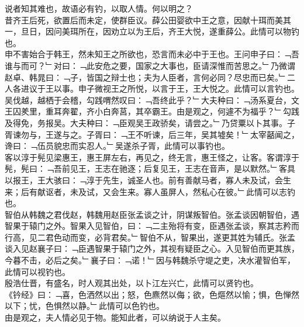 说者知其难也，故语必有钓，以取人情。何以明之？\\
昔齐王后死，欲置后而未定，使群臣议。薛公田婴欲中王之意，因献十珥而美其一，旦日，因问美珥所在，因劝立以为王后，齐王大悦，遂重薛公。此情可以物钓也。\\
申不害始合于韩王，然未知王之所欲也，恐言而未必中于王也。王问申子曰：﹁吾谁与而可？﹂对曰：﹁此安危之要，国家之大事也，臣请深惟而苦思之。﹂乃微谓赵卓、韩晁曰：﹁子，皆国之辩士也；夫为人臣者，言何必同？尽忠而已矣。﹂二人各进议于王以事。申子微视王之所悦，以言于王，王大悦之。此情可以言钓也。\\
吴伐越，越栖于会稽，勾践喟然叹曰：﹁吾终此乎？﹂大夫种曰：﹁汤系夏台，文王囚羑里，重耳奔翟，齐小白奔莒，其卒霸王。由是观之，何遽不为福乎？﹂勾践及得免，务报吴。大夫种曰：﹁臣观吴王政骄矣，请尝之。﹂乃贷粟以卜其事。子胥谏勿与，王遂与之。子胥曰：﹁王不听谏，后三年，吴其墟矣！﹂太宰嚭闻之，谗曰：﹁伍员貌忠而实忍人。﹂吴遂杀子胥，此情可以事钓也。\\
客以淳于髡见梁惠王，惠王屏左右，再见之，终无言，惠王怪之，让客。客谓淳于髡，髡曰：﹁吾前见王，王志在驰逐；后复见王，王志在音声，是以默然。﹂客具以报王，王大骇曰：﹁淳于先生，诚圣人也。前有善献马者，寡人未及试，会生来；后有献讴者，未及试，又会生来。寡人虽屏人，然私心在彼。﹂此情可以志钓也。\\
智伯从韩魏之君伐赵，韩魏用赵臣张孟谈之计，阴谋叛智伯。张孟谈因朝智伯，遇智果于辕门之外。智果入见智伯，曰：﹁二主殆将有变，臣遇张孟谈，察其志矜而行高，见二君色动而变，必背君矣。﹂智伯不从，智果出，遂更其姓为辅氏。张孟谈入见赵襄子曰：﹁臣遇智果于辕门之外，其视有疑臣之心。入见智伯而更其族，今暮不击，必后之矣。﹂襄子曰：﹁诺！﹂因与韩魏杀守堤之吏，决水灌智伯军，此情可以视钓也。\\
殷浩仕晋，有盛名，时人观其出处，以卜江左兴亡，此情可以贤钓也。\\
《钤经》曰：﹁喜，色洒然以出；怒，色麃然以侮；欲，色熰然以愉；惧，色惮然以下；忧，色惧然以静。﹂此情可以色钓也。\\
由是观之，夫人情必见于物。能知此者，可以纳说于人主矣。
%
%
